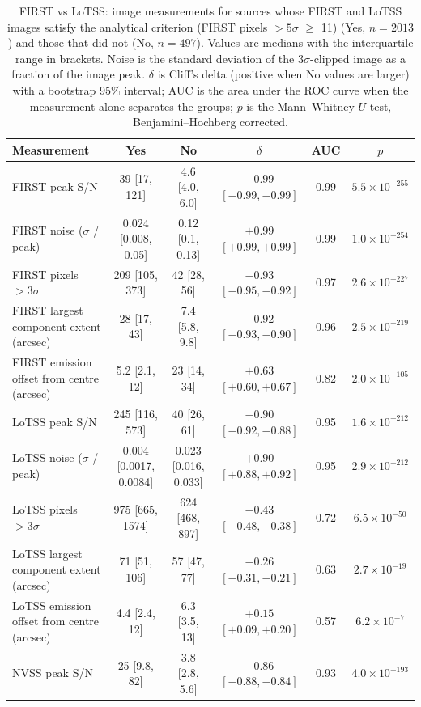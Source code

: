 \begin{table}
\centering
\caption{FIRST vs LoTSS: image measurements for sources whose FIRST and LoTSS images satisfy the analytical criterion (FIRST pixels $>5\sigma$ $\geq$ 11) (Yes, $n=2013$) and those that did not (No, $n=497$). Values are medians with the interquartile range in brackets. Noise is the standard deviation of the $3\sigma$-clipped image as a fraction of the image peak. $\delta$ is Cliff's delta (positive when No values are larger) with a bootstrap 95\% interval; AUC is the area under the ROC curve when the measurement alone separates the groups; $p$ is the Mann--Whitney $U$ test, Benjamini--Hochberg corrected.}
\label{tab:morphology_analytical_FIRST_vs_LoTSS}
\begin{tabular}{lccccc}
\hline
Measurement & Yes & No & $\delta$ & AUC & $p$ \\
\hline
FIRST peak S/N & 39 [17, 121] & 4.6 [4.0, 6.0] & $-0.99$ $[-0.99, -0.99]$ & 0.99 & $5.5\times10^{-255}$ \\
FIRST noise ($\sigma$ / peak) & 0.024 [0.008, 0.05] & 0.12 [0.1, 0.13] & $+0.99$ $[+0.99, +0.99]$ & 0.99 & $1.0\times10^{-254}$ \\
FIRST pixels $>3\sigma$ & 209 [105, 373] & 42 [28, 56] & $-0.93$ $[-0.95, -0.92]$ & 0.97 & $2.6\times10^{-227}$ \\
FIRST largest component extent (arcsec) & 28 [17, 43] & 7.4 [5.8, 9.8] & $-0.92$ $[-0.93, -0.90]$ & 0.96 & $2.5\times10^{-219}$ \\
FIRST emission offset from centre (arcsec) & 5.2 [2.1, 12] & 23 [14, 34] & $+0.63$ $[+0.60, +0.67]$ & 0.82 & $2.0\times10^{-105}$ \\
LoTSS peak S/N & 245 [116, 573] & 40 [26, 61] & $-0.90$ $[-0.92, -0.88]$ & 0.95 & $1.6\times10^{-212}$ \\
LoTSS noise ($\sigma$ / peak) & 0.004 [0.0017, 0.0084] & 0.023 [0.016, 0.033] & $+0.90$ $[+0.88, +0.92]$ & 0.95 & $2.9\times10^{-212}$ \\
LoTSS pixels $>3\sigma$ & 975 [665, 1574] & 624 [468, 897] & $-0.43$ $[-0.48, -0.38]$ & 0.72 & $6.5\times10^{-50}$ \\
LoTSS largest component extent (arcsec) & 71 [51, 106] & 57 [47, 77] & $-0.26$ $[-0.31, -0.21]$ & 0.63 & $2.7\times10^{-19}$ \\
LoTSS emission offset from centre (arcsec) & 4.4 [2.4, 12] & 6.3 [3.5, 13] & $+0.15$ $[+0.09, +0.20]$ & 0.57 & $6.2\times10^{-7}$ \\
NVSS peak S/N & 25 [9.8, 82] & 3.8 [2.8, 5.6] & $-0.86$ $[-0.88, -0.84]$ & 0.93 & $4.0\times10^{-193}$ \\

\end{tabular}
\end{table}
